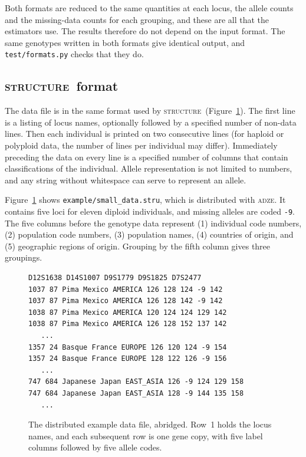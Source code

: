 \documentclass[11pt]{article}
\newcommand{\prog}{\textsc{adze}}
\newcommand{\structureprog}{\textsc{structure}}
\begin{document}
Both formats are reduced to the same quantities at each locus, the allele
counts and the missing-data counts for each grouping, and these are all that
the estimators use. The results therefore do not depend on the input format.
The same genotypes written in both formats give identical output, and
\texttt{test/formats.py} checks that they do.

\subsection{\structureprog\ format}
\label{sec:format}

The data file is in the same format used by \structureprog\
(Figure~\ref{fig:datafile}). The first line is a listing of locus names,
optionally followed by a specified number of non-data lines. Then each
individual is printed on two consecutive lines (for haploid or polyploid data,
the number of lines per individual may differ). Immediately preceding the data
on every line is a specified number of columns that contain classifications of
the individual. Allele representation is not limited to numbers, and any
string without whitespace can serve to represent an allele.

Figure~\ref{fig:datafile} shows \texttt{example/small\_data.stru}, which is
distributed with \prog. It contains five loci for eleven diploid individuals,
and missing alleles are coded \texttt{-9}. The five columns before the
genotype data represent (1) individual code numbers, (2) population code
numbers, (3) population names, (4) countries of origin, and (5) geographic
regions of origin. Grouping by the fifth column gives three groupings.

\begin{figure}[htbp]
\begin{Verbatim}[fontsize=\small,frame=single]
D12S1638 D14S1007 D9S1779 D9S1825 D7S2477
1037 87 Pima Mexico AMERICA 126 128 124 -9 142
1037 87 Pima Mexico AMERICA 126 128 142 -9 142
1038 87 Pima Mexico AMERICA 120 124 124 129 142
1038 87 Pima Mexico AMERICA 126 128 152 137 142
   ...
1357 24 Basque France EUROPE 126 120 124 -9 154
1357 24 Basque France EUROPE 128 122 126 -9 156
   ...
747 684 Japanese Japan EAST_ASIA 126 -9 124 129 158
747 684 Japanese Japan EAST_ASIA 128 -9 144 135 158
   ...
\end{Verbatim}
\caption{The distributed example data file, abridged. Row~1 holds the locus
names, and each subsequent row is one gene copy, with five label columns
followed by five allele codes.}
\label{fig:datafile}
\end{figure}
\end{document}
